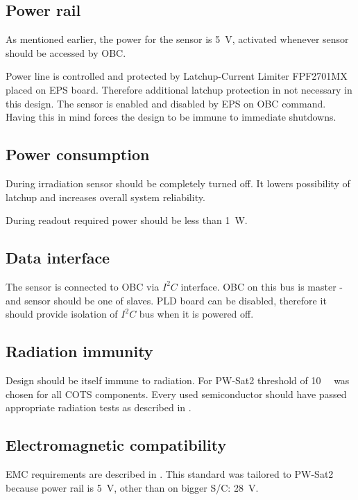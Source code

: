 \subsection{Power rail}
	As mentioned earlier, the power for the sensor is \SI{+5}{\volt}, activated whenever sensor should be accessed by OBC. 
	
	Power line is controlled and protected by Latchup-Current Limiter FPF2701MX placed on EPS board. Therefore additional latchup protection in not necessary in this design. The sensor is enabled and disabled by EPS on OBC command. Having this in mind forces the design to be immune to immediate shutdowns. 

\subsection{Power consumption}
	During irradiation sensor should be completely turned off. It lowers possibility of latchup and increases overall system reliability.
	
	During readout required power should be less than \SI{1}{W}.
	
\subsection{Data interface}
	The sensor is connected to OBC via $I^2C$ interface. OBC on this bus is master - and sensor should be one of slaves. PLD board can be disabled, therefore it should provide isolation of $I^2C$ bus when it is powered off.
	
\subsection{Radiation immunity}
	Design should be itself immune to radiation. For PW-Sat2 threshold of \SI{10}{\kilo\rad} was chosen for all COTS components. Every used semiconductor should have passed appropriate radiation tests as described in \cite{ESCIES_TID_test_method}.

\subsection{Electromagnetic compatibility}
	EMC requirements are described in \cite{ECSS_E_ST_20_07C}. This standard was tailored to PW-Sat2 because power rail is \SI{+5}{\volt}, other than on bigger S/C: \SI{+28}{\volt}.
	

